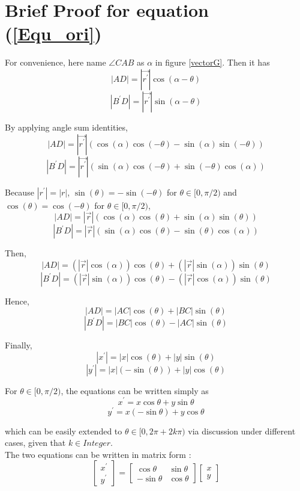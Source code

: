 \section{Brief Proof for equation (\ref{Equ_ori})}
\par\noindent

For convenience, here name $\angle CAB $ as $\alpha$ in figure \ref{vectorG}. Then it has
$$|AD| = |\vec{r^{'}}| \cos(\alpha - \theta)$$
$$|B^{'}D| = |\vec{r^{'}}| \sin(\alpha - \theta)$$

By applying angle sum identities,
$$|AD| = |\vec{r^{'}}| (\cos(\alpha)\cos(-\theta) - \sin(\alpha)\sin(-\theta))$$
$$|B^{'}D| = |\vec{r^{'}}| (\sin(\alpha)\cos(-\theta) + \sin(-\theta)\cos(\alpha))$$

Because $|r^{'}| = |r|$, $\sin(\theta) = - \sin(-\theta)$ for $\theta \in [0, \pi/2)$ and $\cos(\theta) = \cos(-\theta)$ for $\theta \in [0, \pi/2)$,
$$|AD| = |\vec{r}| (\cos(\alpha)\cos(\theta) + \sin(\alpha)\sin(\theta))$$
$$|B^{'}D| = |\vec{r}| (\sin(\alpha)\cos(\theta) - \sin(\theta)\cos(\alpha))$$

Then,
$$|AD| = (|\vec{r}|\cos(\alpha))\cos(\theta) + (|\vec{r}|\sin(\alpha))\sin(\theta)$$
$$|B^{'}D| = (|\vec{r}|\sin(\alpha))\cos(\theta) - (|\vec{r}|\cos(\alpha))\sin(\theta)$$

Hence,
$$|AD| = |AC|\cos(\theta) + |BC|\sin(\theta)$$
$$|B^{'}D| = |BC|\cos(\theta) - |AC|\sin(\theta)$$

Finally,
$$|x^{'}| = |x|\cos(\theta) + |y|\sin(\theta)$$
$$|y^{'}| = |x|(- \sin(\theta)) + |y|\cos(\theta)$$

For $\theta \in [0, \pi/2)$, the equations can be written simply as
$$ x^{'} = x\cos\theta + y\sin\theta$$
$$ y^{'} = x(- \sin\theta) + y\cos\theta$$

which can be easily extended to $\theta \in [ 0, 2\pi + 2k\pi)$ via discussion under different cases, given that $k \in Integer$.\\

The two equations can be written in matrix form :
\begin{equation*}
  \begin{bmatrix}
   x^{'} \\ y^{'}
   \end{bmatrix} =   \begin{bmatrix}
      \cos\theta & \sin\theta \\
      -\sin\theta & \cos\theta
    \end{bmatrix} \begin{bmatrix}
      x \\ y
     \end{bmatrix}
\end{equation*}
